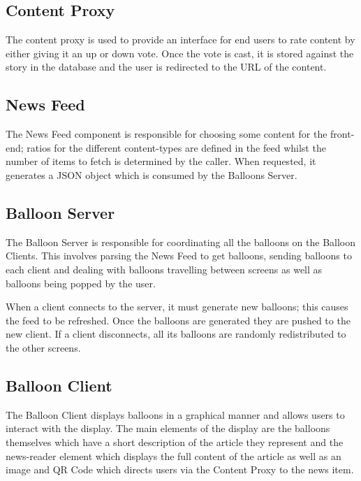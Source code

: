 \documentclass{article}
\begin{document}
\subsection{Content Proxy}
The content proxy is used to provide an interface for end users to rate content
by either giving it an up or down vote. Once the vote is cast, it is stored
against the story in the database and the user is redirected to the URL of the
content.

\subsection{News Feed}
The News Feed component is responsible for choosing some content for the 
front-end; ratios for the different content-types are defined in the feed 
whilst the number of items to fetch is determined by the caller. When 
requested, it generates a JSON object which is consumed by the Balloons Server.

\subsection{Balloon Server}
The Balloon Server is responsible for coordinating all the balloons on the 
Balloon Clients. This involves parsing the News Feed to get balloons, sending
balloons to each client and dealing with balloons travelling between screens 
as well as balloons being popped by the user. 

When a client connects to the server, it must generate new balloons; this 
causes the feed to be refreshed. Once the balloons are generated they are 
pushed to the new client. If a client disconnects, all its balloons are 
randomly redistributed to the other screens.

\subsection{Balloon Client}
The Balloon Client displays balloons in a graphical manner and allows users to
interact with the display. The main elements of the display are the balloons 
themselves which have a short description of the article they represent and the
news-reader element which displays the full content of the article as well as
an image and QR Code which directs users via the Content Proxy to the news item.
\end{document}
